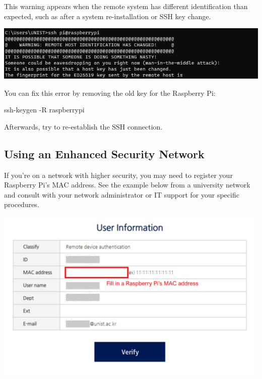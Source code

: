 \documentclass[
  letterpaper,
]{scrbook}
\newenvironment{Shaded}{\begin{snugshade}}{\end{snugshade}}
\newcommand{\AttributeTok}[1]{\textcolor[rgb]{0.40,0.45,0.13}{#1}}
\newcommand{\FunctionTok}[1]{\textcolor[rgb]{0.28,0.35,0.67}{#1}}
\newcommand{\NormalTok}[1]{\textcolor[rgb]{0.00,0.23,0.31}{#1}}
\begin{document}
This warning appears when the remote system has different identification
than expected, such as after a system re-installation or SSH key change.

\includegraphics{content/material/ch2/ssh_error.png}

You can fix this error by removing the old key for the Raspberry Pi:

\begin{Shaded}
\begin{Highlighting}[]
\FunctionTok{ssh{-}keygen} \AttributeTok{{-}R}\NormalTok{ raspberrypi}
\end{Highlighting}
\end{Shaded}

Afterwards, try to re-establish the SSH connection.

\hypertarget{using-an-enhanced-security-network}{%
\subsection{Using an Enhanced Security
Network}\label{using-an-enhanced-security-network}}

If you're on a network with higher security, you may need to register
your Raspberry Pi's MAC address. See the example below from a university
network and consult with your network administrator or IT support for
your specific procedures.

\includegraphics[width=5.20833in,height=\textheight]{content/material/ch2/network_unist.png}
\end{document}
